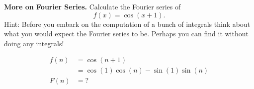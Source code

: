 \textbf{More on Fourier Series.} Calculate the Fourier series
of \[f(x) = \cos(x + 1).\] Hint: Before you embark on the computation
of a bunch of integrals think about what you would expect the Fourier
series to be. Perhaps you can find it without doing any integrals!

{\color{blue}

\[
\begin{aligned}
f(n) &= \cos(n+1) \\
     &= \cos(1) \cos(n) - \sin(1) \sin(n) \\
F(n) &= ? %
\end{aligned}
\]

}
